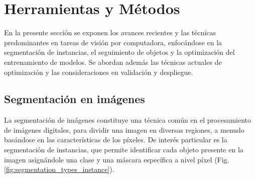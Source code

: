 \section{Herramientas y Métodos}
En la presente sección se exponen los avances recientes y las técnicas predominantes en tareas de visión por computadora, enfocándose en la segmentación de instancias, el seguimiento de objetos y la optimización del entrenamiento de modelos. Se abordan además las técnicas actuales de optimización y las consideraciones en validación y despliegue.

\subsection{Segmentación en imágenes}
La segmentación de imágenes constituye una técnica común en el procesamiento de imágenes digitales, para dividir una imagen en diversas regiones, a menudo basándose en las características de los píxeles. De interés particular es la segmentación de instancias, que permite identificar cada objeto presente en la imagen asignándole una clase y una máscara específica a nivel píxel (Fig. \ref{fig:segmentation_types_instance}).

